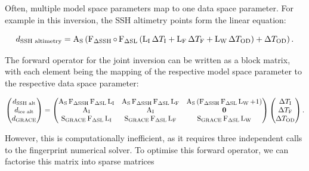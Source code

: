 Often, multiple model space parameters map to one data space parameter. For example in this inversion, the SSH altimetry points form the linear equation:

\begin{equation}
	d_{\text{SSH altimetry}} = \operatorname{{A}}_{{\mathrm{S}}}\left( \operatorname{{F}}_{{\Delta \mathrm{SSH}}} \circ \operatorname{{F}}_{{\Delta \mathrm{SL}}} \left(\operatorname{{L}}_{{\text{I}}} \Delta T_\text{I} + \operatorname{{L}}_{{\text{F}}} \Delta T_\text{F} + \operatorname{{L}}_{{\text{W}}} \Delta T_\text{OD}\right) + \Delta T_\text{OD}\right).
\end{equation}

The forward operator for the joint inversion can be written as a block matrix, with each element being the mapping of the respective model space parameter to the respective data space parameter:

\begin{align}
\begin{pmatrix}
    d_{\text{SSH alt}} \\ d_{\text{ice alt}} \\ d_{\text{GRACE}}
\end{pmatrix}
=
\begin{pmatrix}
    \operatorname{{A}}_{{\mathrm{S}}} \operatorname{{F}}_{{\Delta \mathrm{SSH}}} \operatorname{{F}}_{{\Delta \mathrm{SL}}} \operatorname{{L}}_{{\text{I}}}
        & \operatorname{{A}}_{{\mathrm{S}}} \operatorname{{F}}_{{\Delta \mathrm{SSH}}} \operatorname{{F}}_{{\Delta \mathrm{SL}}} \operatorname{{L}}_{{\text{F}}}
        & \operatorname{{A}}_{{\mathrm{S}}}\left(\operatorname{{F}}_{{\Delta \mathrm{SSH}}} \operatorname{{F}}_{{\Delta \mathrm{SL}}} \operatorname{{L}}_{{\text{W}}} + 1\right) \\
    \operatorname{{A}}_{{\mathrm{I}}} & \operatorname{{A}}_{{\mathrm{I}}} & \mathbf{0} \\
    \operatorname{{S}}_{{\mathrm{GRACE}}} \operatorname{{F}}_{{\Delta \mathrm{SL}}} \operatorname{{L}}_{{\text{I}}}
        & \operatorname{{S}}_{{\mathrm{GRACE}}} \operatorname{{F}}_{{\Delta \mathrm{SL}}} \operatorname{{L}}_{{\text{F}}}
        & \operatorname{{S}}_{{\mathrm{GRACE}}} \operatorname{{F}}_{{\Delta \mathrm{SL}}} \operatorname{{L}}_{{\text{W}}}
\end{pmatrix}
\begin{pmatrix}
    \Delta T_\text{I} \\ \Delta T_\text{F} \\ \Delta T_\text{OD}
\end{pmatrix}.
\end{align}

However, this is computationally inefficient, as it requires three independent calls to the fingerprint numerical solver. To optimise this forward operator, we can factorise this matrix into sparse matrices


